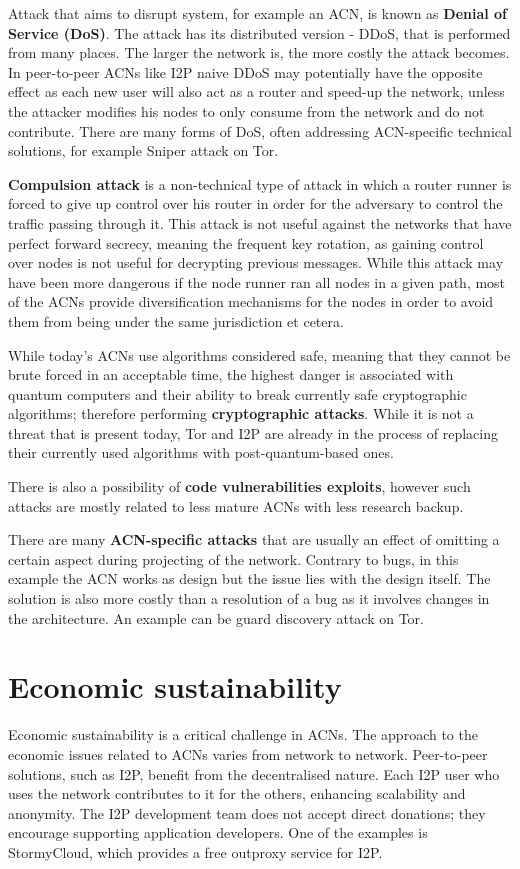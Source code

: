 Attack that aims to disrupt system, for example an ACN, is known as \textbf{Denial of Service (DoS)}. The attack has its distributed version - DDoS, that is performed from many places. The larger the network is, the more costly the attack becomes. In peer-to-peer ACNs like I2P naive DDoS may potentially have the opposite effect as each new user will also act as a router and speed-up the network, unless the attacker modifies his nodes to only consume from the network and do not contribute. There are many forms of DoS, often addressing ACN-specific technical solutions, for example Sniper attack \cite{sniper} on Tor.

\textbf{Compulsion attack} is a non-technical type of attack in which a router runner is forced to give up control over his router in order for the adversary to control the traffic passing through it. This attack is not useful against the networks that have perfect forward secrecy, meaning the frequent key rotation, as gaining control over nodes is not useful for decrypting previous messages. While this attack may have been more dangerous if the node runner ran all nodes in a given path, most of the ACNs provide diversification mechanisms for the nodes in order to avoid them from being under the same jurisdiction et cetera.

While today's ACNs use algorithms considered safe, meaning that they cannot be brute forced in an acceptable time, the highest danger is associated with quantum computers and their ability to break currently safe cryptographic algorithms; therefore performing \textbf{cryptographic attacks}. While it is not a threat that is present today, Tor and I2P are already in the process of replacing their currently used algorithms with post-quantum-based ones.

There is also a possibility of \textbf{code vulnerabilities exploits}, however such attacks are mostly related to less mature ACNs with less research backup.

There are many \textbf{ACN-specific attacks} that are usually an effect of omitting a certain aspect during projecting of the network. Contrary to bugs, in this example the ACN works as design but the issue lies with the design itself. The solution is also more costly than a resolution of a bug as it involves changes in the architecture. An example can be guard discovery attack \cite{guard-discovery} on Tor.

\section{Economic sustainability}
Economic sustainability is a critical challenge in ACNs. The approach to the economic issues related to ACNs varies from network to network. Peer-to-peer solutions, such as I2P, benefit from the decentralised nature. Each I2P user who uses the network contributes to it for the others, enhancing scalability and anonymity. The I2P development team does not accept direct donations; they encourage supporting application developers. One of the examples is StormyCloud, which provides a free outproxy service for I2P.

